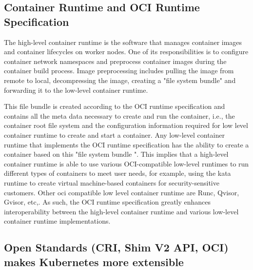 \subsection{Container Runtime and OCI Runtime Specification}
The high-level container runtime is the software that manages container images and container lifecycles on worker nodes. One of its responsibilities is to configure container network namespaces  and preprocess container images during the container 
build process. Image preprocessing includes pulling the image from remote to local, decompressing the image, creating a "file system bundle" and forwarding it to the low-level container runtime.

This file bundle is created according to the OCI runtime specification and contains all the meta data necessary to create and run the container, i.e., the container root file system and the configuration information required for low level container 
runtime to create and start a container. Any low-level container runtime that implements the OCI runtime specification has the ability to create a container based on this "file system bundle ". This implies that a high-level container runtime is 
able to use various OCI-compatible low-level runtimes to run different types of containers to meet user needs, for example, using the kata runtime to create virtual machine-based containers for security-sensitive customers. Other oci compatible low 
level container runtime are Runc, Qvisor, Gvisor, etc,. As such, the OCI runtime specification greatly enhances interoperability between the high-level container runtime and various low-level container runtime implementations.



\subsection{Open Standards (CRI\cite*{cri-interface}, Shim V2 API, OCI\cite*{oci-spec}) makes Kubernetes more extensible}
